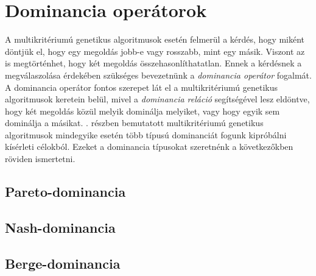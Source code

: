 \section{Dominancia operátorok}
A multikritériumú genetikus algoritmusok esetén felmerül a kérdés, hogy miként döntjük el, hogy egy megoldás jobb-e vagy rosszabb, mint egy másik.
Viszont az is megtörténhet, hogy két megoldás összehasonlíthatatlan.
Ennek a kérdésnek a megválaszolása érdekében szükséges bevezetnünk a \textit{dominancia operátor} fogalmát.
A dominancia operátor fontos szerepet lát el a multikritériumú genetikus algoritmusok keretein belül,
mivel a \textit{dominancia reláció} segítségével lesz eldöntve, hogy két megoldás közül melyik dominálja melyiket, vagy hogy egyik sem dominálja a másikat.
. részben bemutatott multikritériumú genetikus algoritmusok mindegyike esetén több típusú dominanciát fogunk kipróbálni kísérleti célokból.
Ezeket a dominancia típusokat szeretnénk a következőkben röviden ismertetni.


\subsection{Pareto-dominancia}



\subsection{Nash-dominancia}



\subsection{Berge-dominancia}
